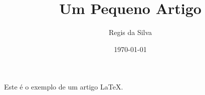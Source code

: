 \documentclass[a4paper]{article}
\author{Regis da Silva}
\title{Um Pequeno Artigo}
\date{\today}
\begin{document}
  \maketitle
  Este é o exemplo de um artigo \LaTeX.
\end{document}
